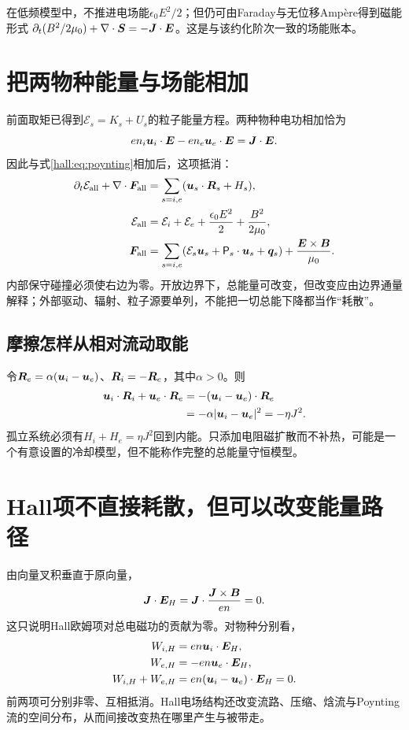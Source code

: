 在低频模型中，不推进电场能$\epsilon_0E^2/2$；但仍可由Faraday与无位移Ampère得到磁能形式
$\partial_t(B^2/2\mu_0)+\nabla\cdot\bm{S}=-\bm{J}\cdot\bm{E}$。这是与该约化阶次一致的场能账本。

\section{把两物种能量与场能相加}
前面取矩已得到$\mathcal E_s=K_s+U_s$的粒子能量方程。两种物种电功相加恰为
\begin{equation}
en_i\bm{u}_i\cdot\bm{E}-en_e\bm{u}_e\cdot\bm{E}=\bm{J}\cdot\bm{E}.
\end{equation}
因此与式\eqref{hall:eq:poynting}相加后，这项抵消：
\begin{align}
\partial_t\mathcal E_{\rm all}+\nabla\cdot\bm{F}_{\rm all}
&=\sum_{s=i,e}(\bm{u}_s\cdot\bm{R}_s+H_s),\\
\mathcal E_{\rm all}&=\mathcal E_i+\mathcal E_e+\frac{\epsilon_0E^2}{2}+\frac{B^2}{2\mu_0},\\
\bm{F}_{\rm all}&=\sum_{s=i,e}(\mathcal E_s\bm{u}_s+\mathsf P_s\cdot\bm{u}_s+\bm{q}_s)
+\frac{\bm{E}\times\bm{B}}{\mu_0}.
\label{hall:eq:total-energy}
\end{align}
内部保守碰撞必须使右边为零。开放边界下，总能量可改变，但改变应由边界通量解释；外部驱动、辐射、粒子源要单列，不能把一切总能下降都当作“耗散”。

\subsection{摩擦怎样从相对流动取能}
令$\bm{R}_e=\alpha(\bm{u}_i-\bm{u}_e)$、$\bm{R}_i=-\bm{R}_e$，其中$\alpha>0$。则
\begin{align}
\bm{u}_i\cdot\bm{R}_i+\bm{u}_e\cdot\bm{R}_e
&=-(\bm{u}_i-\bm{u}_e)\cdot\bm{R}_e\\
&=-\alpha|\bm{u}_i-\bm{u}_e|^2=-\eta J^2.
\end{align}
孤立系统必须有$H_i+H_e=\eta J^2$回到内能。只添加电阻磁扩散而不补热，可能是一个有意设置的冷却模型，但不能称作完整的总能量守恒模型。

\section{Hall项不直接耗散，但可以改变能量路径}
由向量叉积垂直于原向量，
\begin{equation}
\bm{J}\cdot\bm{E}_H=\bm{J}\cdot\frac{\bm{J}\times\bm{B}}{en}=0.
\end{equation}
这只说明Hall欧姆项对总电磁功的贡献为零。对物种分别看，
\begin{align}
W_{i,H}&=en\bm{u}_i\cdot\bm{E}_H,\\
W_{e,H}&=-en\bm{u}_e\cdot\bm{E}_H,\\
W_{i,H}+W_{e,H}&=en(\bm{u}_i-\bm{u}_e)\cdot\bm{E}_H=0.
\end{align}
前两项可分别非零、互相抵消。Hall电场结构还改变流路、压缩、焓流与Poynting流的空间分布，从而间接改变热在哪里产生与被带走。


